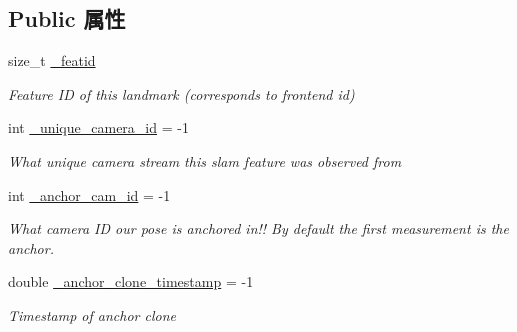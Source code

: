\subsection*{Public 属性}
\begin{DoxyCompactItemize}
\item 
\mbox{\label{classov__type_1_1Landmark_ad8e61393e2cf88ad04055081d93c1281}} 
size\+\_\+t \hyperlink{classov__type_1_1Landmark_ad8e61393e2cf88ad04055081d93c1281}{\+\_\+featid}
\begin{DoxyCompactList}\small\item\em Feature ID of this landmark (corresponds to frontend id) \end{DoxyCompactList}\item 
\mbox{\label{classov__type_1_1Landmark_a97b5c9a2110e0fad40eefcecb3f5fb14}} 
int \hyperlink{classov__type_1_1Landmark_a97b5c9a2110e0fad40eefcecb3f5fb14}{\+\_\+unique\+\_\+camera\+\_\+id} = -\/1
\begin{DoxyCompactList}\small\item\em What unique camera stream this slam feature was observed from \end{DoxyCompactList}\item 
\mbox{\label{classov__type_1_1Landmark_acbc8b8af7f85c0dc123365046f1af432}} 
int \hyperlink{classov__type_1_1Landmark_acbc8b8af7f85c0dc123365046f1af432}{\+\_\+anchor\+\_\+cam\+\_\+id} = -\/1
\begin{DoxyCompactList}\small\item\em What camera ID our pose is anchored in!! By default the first measurement is the anchor. \end{DoxyCompactList}\item 
\mbox{\label{classov__type_1_1Landmark_a734c934cc4bf108ad228bd0f0596ef2a}} 
double \hyperlink{classov__type_1_1Landmark_a734c934cc4bf108ad228bd0f0596ef2a}{\+\_\+anchor\+\_\+clone\+\_\+timestamp} = -\/1
\begin{DoxyCompactList}\small\item\em Timestamp of anchor clone \end{DoxyCompactList}\item 
\mbox{\label{classov__type_1_1Landmark_a8c2faa8e153b95606c9062527fdd029e}} 

\end{DoxyCompactItemize}
